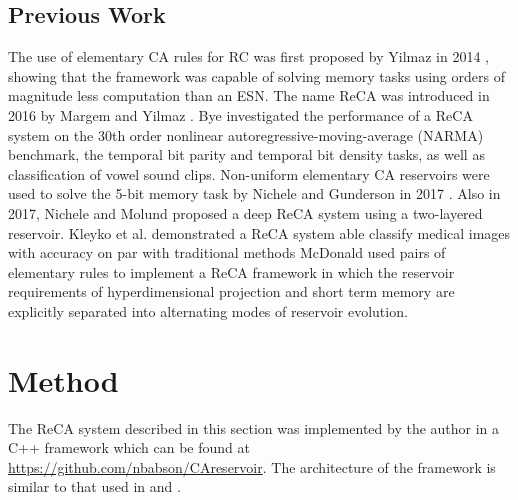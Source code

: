 \documentclass{elsarticle}
\begin{document}
\begin{multicols}{2}
\subsection{Previous Work}

The use of elementary CA rules for RC was 
   first proposed by Yilmaz in 2014 \cite{yilmaz2014reservoir}
, showing that the framework was capable of 
   solving memory tasks using orders of magnitude less computation than an ESN.
   The name ReCA was introduced in 2016 by Margem 
   and Yilmaz \cite{margem2017experimental}. Bye \cite{bye2016investigation} investigated the performance 
   of a ReCA system on the 30th order nonlinear autoregressive-moving-average 
   (NARMA) benchmark, the temporal bit parity and temporal bit density tasks, 
   as well as classification of vowel sound clips.  
      Non-uniform elementary CA reservoirs were used to solve the 5-bit memory 
      task by Nichele and Gunderson in 2017 \cite{nichele2017reservoir}. Also 
      in 2017, Nichele and Molund \cite{nichele2017deep}
proposed a deep ReCA system using a 
      two-layered reservoir. Kleyko et al. \cite{kleyko2017modality} 
demonstrated a ReCA system able classify medical images with accuracy on par 
    with traditional methods McDonald \cite{mcdonald2017reservoir} used pairs 
    of elementary rules to implement a ReCA framework in which the reservoir 
    requirements of hyperdimensional projection and short term memory are 
    explicitly separated into alternating modes of reservoir evolution.
 





\section{Method}\label{method}
The ReCA system described in this section was implemented by the author in a 
C++ framework which can be found at \url{https://github.com/nbabson/CAreservoir}. The 
architecture of the framework is similar to that used in  
\cite{nichele2017deep} and \cite{bye2016investigation}.


\end{multicols}
\end{document}

